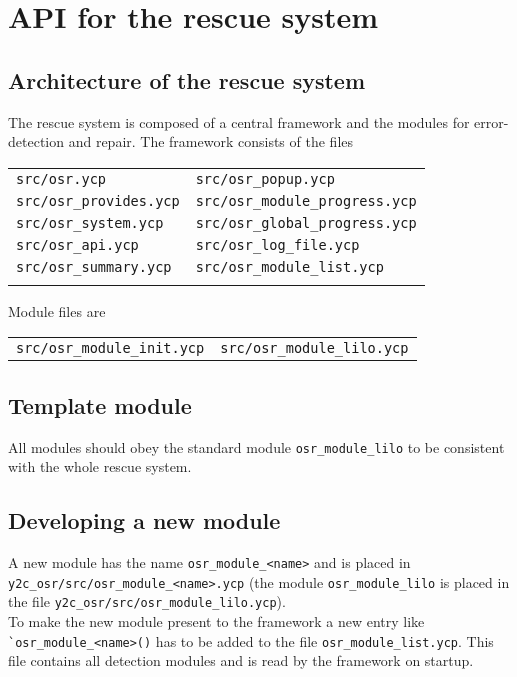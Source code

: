 \chapter{API for the rescue system}

\section{Architecture of the rescue system}
The rescue system is composed of a central framework and the modules for
error-detection and repair. The framework consists of the files\\

\begin{tabular}{ll}
\verb+src/osr.ycp+ & \verb+src/osr_popup.ycp+\\
\verb+src/osr_provides.ycp+ & \verb+src/osr_module_progress.ycp+\\
\verb+src/osr_system.ycp+ & \verb+src/osr_global_progress.ycp+\\
\verb+src/osr_api.ycp+ & \verb+src/osr_log_file.ycp+\\
\verb+src/osr_summary.ycp+ & \verb+src/osr_module_list.ycp+\\\\
\end{tabular}

Module files are\\

\begin{tabular}{ll}
\verb+src/osr_module_init.ycp+ & \verb+src/osr_module_lilo.ycp+\\
\end{tabular}

\section{Template module}
All modules should obey the standard module \verb+osr_module_lilo+ to be consistent
with the whole rescue system.

\section{Developing a new module}
A new module has the name \verb+osr_module_<name>+ and is placed in 
\verb+y2c_osr/src/osr_module_<name>.ycp+ (the module \verb+osr_module_lilo+ is placed in
the file \verb+y2c_osr/src/osr_module_lilo.ycp+).\\

To make the new module present to the framework a new
entry like \verb+`osr_module_<name>()+ has to be added to the file
\verb+osr_module_list.ycp+. This file contains all detection modules and
is read by the framework on startup.

